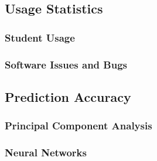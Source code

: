 \subsection{Usage Statistics}
\subsubsection{Student Usage}
\subsubsection{Software Issues and Bugs}

\subsection{Prediction Accuracy}
\subsubsection{Principal Component Analysis}
\subsubsection{Neural Networks}

